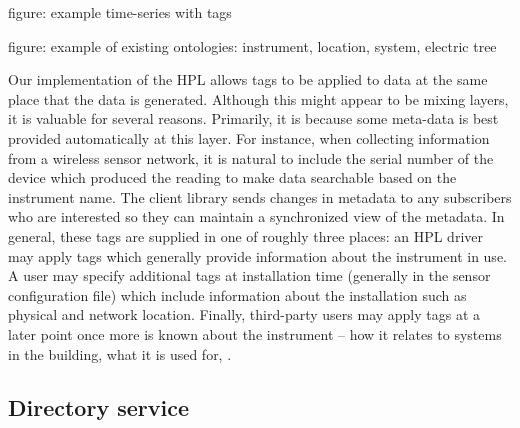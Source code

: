 figure: example time-series with tags

figure: example of existing ontologies: instrument, location, system, electric tree

Our implementation of the HPL allows tags to be applied to data at the same place that the data is generated.  Although this might appear to be mixing layers, it is valuable for several reasons.  Primarily, it is because some meta-data is best provided automatically at this layer.  For instance, when collecting information from a wireless sensor network, it is natural to include the serial number of the device which produced the reading to make data searchable based on the instrument name. The client library sends changes in metadata to any subscribers who are interested so they can maintain a synchronized view of the metadata.
%
In general, these tags are supplied in one of roughly three places: an HPL driver may apply tags which generally provide information about the instrument in use.  A user may specify additional tags at installation time (generally in the sensor configuration file) which include information about the installation such as physical and network location.  Finally, third-party users may apply tags at a later point once more is known about the instrument -- how it relates to systems in the building, what it is used for, \etc.
 
%


\subsection{Directory service}

